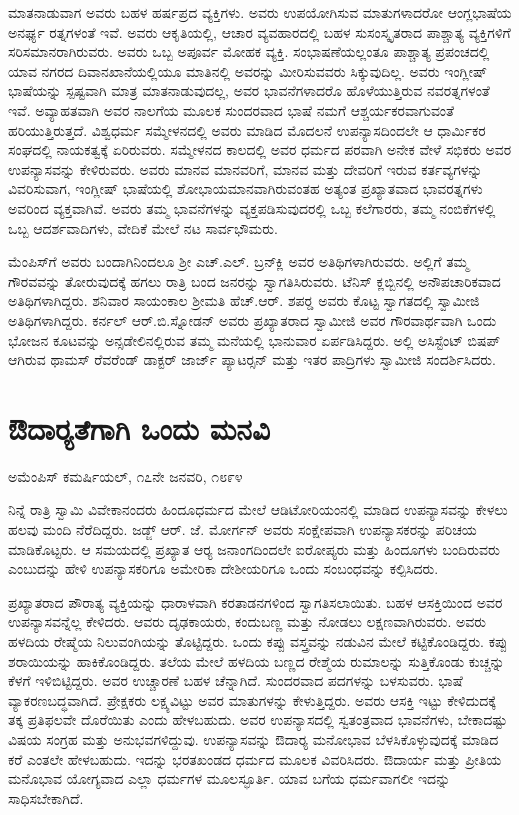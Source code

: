  ಮಾತನಾಡುವಾಗ ಅವರು ಬಹಳ ಹರ್ಷಪ್ರದ ವ್ಯಕ್ತಿಗಳು. ಅವರು ಉಪಯೋಗಿಸುವ ಮಾತುಗಳಾದರೋ ಆಂಗ್ಲಭಾಷೆಯ ಅನರ್ಘ್ಯ ರತ್ನಗಳಂತೆ ಇವೆ. ಅವರು ಆಕೃತಿಯಲ್ಲಿ, ಆಚಾರ ವ್ಯವಹಾರದಲ್ಲಿ ಬಹಳ ಸುಸಂಸ್ಕೃತರಾದ ಪಾಶ್ಚಾತ್ಯ ವ್ಯಕ್ತಿಗಳಿಗೆ ಸರಿಸಮಾನರಾಗಿರುವರು. ಅವರು ಒಬ್ಬ ಅಪೂರ್ವ ಮೋಹಕ ವ್ಯಕ್ತಿ. ಸಂಭಾಷಣೆಯಲ್ಲಂತೂ ಪಾಶ್ಚಾತ್ಯ ಪ್ರಪಂಚದಲ್ಲಿ ಯಾವ ನಗರದ ದಿವಾನಖಾನೆಯಲ್ಲಿಯೂ ಮಾತಿನಲ್ಲಿ ಅವರನ್ನು ಮೀರಿಸುವವರು ಸಿಕ್ಕುವುದಿಲ್ಲ. ಅವರು ಇಂಗ್ಲೀಷ್ ಭಾಷೆಯನ್ನು ಸ್ಪಷ್ಟವಾಗಿ ಮಾತ್ರ ಮಾತನಾಡುವುದಲ್ಲ, ಅವರ ಭಾವನೆಗಳಾದರೊ ಹೊಳೆಯುತ್ತಿರುವ ನವರತ್ನಗಳಂತೆ ಇವೆ. ಅವ್ಯಾಹತವಾಗಿ ಅವರ ನಾಲಗೆಯ ಮೂಲಕ ಸುಂದರವಾದ ಭಾಷೆ ನಮಗೆ ಆಶ್ಚರ್ಯಕರವಾಗುವಂತೆ ಹರಿಯುತ್ತಿರುತ್ತದೆ. ವಿಶ್ವಧರ್ಮ ಸಮ್ಮೇಳನದಲ್ಲಿ ಅವರು ಮಾಡಿದ ಮೊದಲನೆ ಉಪನ್ಯಾಸದಿಂದಲೇ ಆ ಧಾರ್ಮಿಕರ ಸಂಘದಲ್ಲಿ ನಾಯಕತ್ವಕ್ಕೆ ಏರಿರುವರು. ಸಮ್ಮೇಳನದ ಕಾಲದಲ್ಲಿ ಅವರ ಧರ್ಮದ ಪರವಾಗಿ ಅನೇಕ ವೇಳೆ ಸಭಿಕರು ಅವರ ಉಪನ್ಯಾಸವನ್ನು ಕೇಳಿರುವರು. ಅವರು ಮಾನವ ಮಾನವರಿಗೆ, ಮಾನವ ಮತ್ತು ದೇವರಿಗೆ ಇರುವ ಕರ್ತವ್ಯಗಳನ್ನು ವಿವರಿಸುವಾಗ, ಇಂಗ್ಲೀಷ್ ಭಾಷೆಯಲ್ಲಿ ಶೋಭಾಯಮಾನವಾಗಿರುವಂತಹ ಅತ್ಯಂತ ಪ್ರಖ್ಯಾತವಾದ ಭಾವರತ್ನಗಳು ಅವರಿಂದ ವ್ಯಕ್ತವಾಗಿವೆ. ಅವರು ತಮ್ಮ ಭಾವನೆಗಳನ್ನು ವ್ಯಕ್ತಪಡಿಸುವುದರಲ್ಲಿ ಒಬ್ಬ ಕಲೆಗಾರರು, ತಮ್ಮ ನಂಬಿಕೆಗಳಲ್ಲಿ ಒಬ್ಬ ಆದರ್ಶವಾದಿಗಳು, ವೇದಿಕೆ ಮೇಲೆ ನಟ ಸಾರ್ವಭೌಮರು. 

 ಮೆಂಪಿಸ್‍ಗೆ ಅವರು ಬಂದಾಗಿನಿಂದಲೂ ಶ‍್ರೀ ಎಚ್.ಎಲ್. ಬ್ರನ್‍ಕ್ಲಿ ಅವರ ಅತಿಥಿಗಳಾಗಿರುವರು. ಅಲ್ಲಿಗೆ ತಮ್ಮ ಗೌರವವನ್ನು ತೋರುವುದಕ್ಕೆ ಹಗಲು ರಾತ್ರಿ ಬಂದ ಜನರನ್ನು ಸ್ವಾಗತಿಸಿರುವರು. ಟೆನಿಸ್ ಕ್ಲಬ್ಬಿನಲ್ಲಿ ಅನೌಪಚಾರಿಕವಾದ ಅತಿಥಿಗಳಾಗಿದ್ದರು. ಶನಿವಾರ ಸಾಯಂಕಾಲ ಶ‍್ರೀಮತಿ ಹೆಚ್.ಆರ್. ಶಪರ‍್ಡ ಅವರು ಕೊಟ್ಟ ಸ್ವಾಗತದಲ್ಲಿ ಸ್ವಾಮೀಜಿ ಅತಿಥಿಗಳಾಗಿದ್ದರು. ಕರ್ನಲ್ ಆರ್.ಬಿ.ಸ್ನೋಡನ್ ಅವರು ಪ್ರಖ್ಯಾತರಾದ ಸ್ವಾಮೀಜಿ ಅವರ ಗೌರವಾರ್ಥವಾಗಿ ಒಂದು ಭೋಜನ ಕೂಟವನ್ನು ಅನ್ಸ‍ಡೇಲಿನಲ್ಲಿರುವ ತಮ್ಮ ಮನೆಯಲ್ಲಿ ಭಾನುವಾರ ಏರ್ಪಡಿಸಿದ್ದರು. ಅಲ್ಲಿ ಅಸಿಸ್ಟೆಂಟ್ ಬಿಷಪ್ ಆಗಿರುವ ಥಾಮಸ್ ರೆವರೆಂಡ್ ಡಾಕ್ಟರ್ ಜಾರ್ಜ್ ಪ್ಯಾಟರ್‍ಸನ್ ಮತ್ತು ಇತರ ಪಾದ್ರಿಗಳು ಸ್ವಾಮೀಜಿ ಸಂದರ್ಶಿಸಿದರು.


\section{ಔದಾರ‍್ಯತೆಗಾಗಿ ಒಂದು ಮನವಿ}

\begin{flushright}
ಅಮೆಂಪಿಸ್ ಕಮರ್ಷಿಯಲ್, ೧೭ನೇ ಜನವರಿ, ೧೮೯೪ 
\end{flushright}

 ನಿನ್ನೆ ರಾತ್ರಿ ಸ್ವಾಮಿ ವಿವೇಕಾನಂದರು ಹಿಂದೂಧರ್ಮದ ಮೇಲೆ ಆಡಿಟೋರಿಯಂನಲ್ಲಿ ಮಾಡಿದ ಉಪನ್ಯಾಸವನ್ನು ಕೇಳಲು ಹಲವು ಮಂದಿ ನೆರೆದಿದ್ದರು. ಜಡ್ಜ್ ಆರ್. ಜೆ. ಮೋರ್ಗನ್ ಅವರು ಸಂಕ್ಷೇಪವಾಗಿ ಉಪನ್ಯಾಸಕರನ್ನು ಪರಿಚಯ ಮಾಡಿಕೊಟ್ಟರು. ಆ ಸಮಯದಲ್ಲಿ ಪ್ರಖ್ಯಾತ ಆರ‍್ಯ ಜನಾಂಗದಿಂದಲೇ ಐರೋಪ್ಯರು ಮತ್ತು ಹಿಂದೂಗಳು ಬಂದಿರುವರು ಎಂಬುದನ್ನು ಹೇಳಿ ಉಪನ್ಯಾಸಕರಿಗೂ ಅಮೇರಿಕಾ ದೇಶೀಯರಿಗೂ ಒಂದು ಸಂಬಂಧವನ್ನು ಕಲ್ಪಿಸಿದರು. 

 ಪ್ರಖ್ಯಾತರಾದ ಪೌರಾತ್ಯ ವ್ಯಕ್ತಿಯನ್ನು ಧಾರಾಳವಾಗಿ ಕರತಾಡನಗಳಿಂದ ಸ್ವಾಗತಿಸಲಾಯಿತು. ಬಹಳ ಆಸಕ್ತಿಯಿಂದ ಅವರ ಉಪನ್ಯಾಸವನ್ನೆಲ್ಲ ಕೇಳಿದರು. ಆವರು ದೃಢಕಾಯರು, ಕಂದುಬಣ್ಣ ಮತ್ತು ನೋಡಲು ಲಕ್ಷಣವಾಗಿರುವರು. ಅವರು ಹಳದಿಯ ರೇಷ್ಮೆಯ ನಿಲುವಂಗಿಯನ್ನು ತೊಟ್ಟಿದ್ದರು. ಒಂದು ಕಪ್ಪು ವಸ್ತ್ರವನ್ನು ನಡುವಿನ ಮೇಲೆ ಕಟ್ಟಿಕೊಂಡಿದ್ದರು. ಕಪ್ಪು ಶರಾಯಿಯನ್ನು ಹಾಕಿಕೊಂಡಿದ್ದರು. ತಲೆಯ ಮೇಲೆ ಹಳದಿಯ ಬಣ್ಣದ ರೇಶ್ಮೆಯ ರುಮಾಲನ್ನು ಸುತ್ತಿಕೊಂಡು ಕುಚ್ಚನ್ನು ಕೆಳಗೆ ಇಳಿಬಿಟ್ಟಿದ್ದರು. ಅವರ ಉಚ್ಚಾರಣೆ ಬಹಳ ಚೆನ್ನಾಗಿದೆ. ಸುಂದರವಾದ ಪದಗಳನ್ನು ಬಳಸುವರು. ಭಾಷೆ ವ್ಯಾಕರಣಬದ್ಧವಾಗಿದೆ. ಪ್ರೇಕ್ಷಕರು ಲಕ್ಷ್ಯವಿಟ್ಟು ಅವರ ಮಾತುಗಳನ್ನು ಕೇಳುತ್ತಿದ್ದರು. ಅವರು ಆಸಕ್ತಿ ಇಟ್ಟು ಕೇಳಿದುದಕ್ಕೆ ತಕ್ಕ ಪ್ರತಿಫಲವೇ ದೊರೆಯಿತು ಎಂದು ಹೇಳಬಹುದು. ಅವರ ಉಪನ್ಯಾಸದಲ್ಲಿ ಸ್ವತಂತ್ರವಾದ ಭಾವನೆಗಳು, ಬೇಕಾದಷ್ಟು ವಿಷಯ ಸಂಗ್ರಹ ಮತ್ತು ಅನುಭವಗಳಿದ್ದುವು. ಉಪನ್ಯಾಸವನ್ನು ಔದಾರ‍್ಯ ಮನೋಭಾವ ಬೆಳಸಿಕೊಳ್ಳುವುದಕ್ಕೆ ಮಾಡಿದ ಕರೆ ಎಂತಲೇ ಹೇಳಬಹುದು. ಇದನ್ನು ಭರತಖಂಡದ ಧರ್ಮದ ಮೂಲಕ ವಿವರಿಸಿದರು. ಔದಾರ್ಯ ಮತ್ತು ಪ್ರೀತಿಯ ಮನೊಭಾವ ಯೋಗ್ಯವಾದ ಎಲ್ಲಾ ಧರ್ಮಗಳ ಮೂಲಸ್ಫೂರ್ತಿ. ಯಾವ ಬಗೆಯ ಧರ್ಮವಾಗಲೀ ಇದನ್ನು ಸಾಧಿಸಬೇಕಾಗಿದೆ. 

